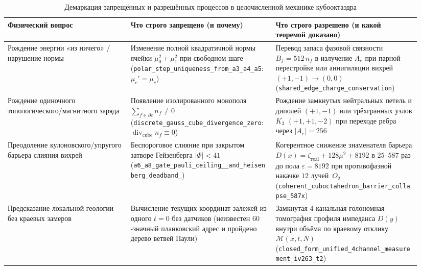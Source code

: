 \begin{table}[htbp]
\centering
\footnotesize
\setlength{\tabcolsep}{4pt}
\caption{Демаркация запрещённых и разрешённых процессов в целочисленной механике кубооктаэдра}
\label{tab:applied-demarcation}
\begin{tabular}{@{}p{0.28\linewidth}p{0.33\linewidth}p{0.33\linewidth}@{}}
\toprule
Физический вопрос & Что строго запрещено (и почему) & Что строго разрешено (и какой теоремой доказано) \\
\midrule
Рождение энергии «из ничего» / нарушение нормы & Изменение полной квадратичной нормы ячейки $\mu_0^2+\mu_1^2$ при свободном шаге (\texttt{polar\_\allowbreak step\_\allowbreak uniqueness\_\allowbreak from\_\allowbreak a3\_\allowbreak a4\_\allowbreak a5}: $\mu_c'=\mu_c$) & Перевод запаса фазовой связности $B_f = 512\,n_f$ в излучение $A_e$ при парной перестройке или аннигиляции вихрей $(+1,-1)\to(0,0)$ (\texttt{shared\_\allowbreak edge\_\allowbreak charge\_\allowbreak conservation}) \\
\addlinespace
Рождение одиночного топологического/магнитного заряда & Появление изолированного монополя $\sum_{f\in\partial c} n_f \ne 0$ (\texttt{discrete\_\allowbreak gauss\_\allowbreak cube\_\allowbreak divergence\_\allowbreak zero}: $\operatorname{div}_{\mathrm{cube}} n_f \equiv 0$) & Рождение замкнутых нейтральных петель и диполей $(+1,-1)$ или трёхгранных узлов $K_3$ $(+1,+1,-2)$ при переходе ребра через $|A_e|=256$ \\
\addlinespace
Преодоление кулоновского/упругого барьера слияния вихрей & Беспороговое слияние при закрытом затворе Гейзенберга $|\Phi|<41$ (\texttt{a6\_\allowbreak a8\_\allowbreak gate\_\allowbreak pauli\_\allowbreak ceiling\_\allowbreak 256\_\allowbreak and\_\allowbreak heisenberg\_\allowbreak deadband\_\allowbreak 41}) & Когерентное снижение знаменателя барьера $D(x) = \zeta_{\mathrm{real}}+128\mu^2+8192$ в $25\text{--}587$ раз до пола $\varepsilon=8192$ при противофазной накачке $12$ лучей~$O_2$ (\texttt{coherent\_\allowbreak cuboctahedron\_\allowbreak barrier\_\allowbreak collapse\_\allowbreak 587x}) \\
\addlinespace
Предсказание локальной геологии без краевых замеров & Вычисление текущих координат залежей из одного $t=0$ без датчиков (неизвестен $60$-значный планковский адрес и пройдено дерево ветвей Паули) & Замкнутая $4$-канальная голономная томография профиля импеданса $D(y)$ внутри объёма по краевому отклику $\mathcal{M}(x,t,N)$ (\texttt{closed\_\allowbreak form\_\allowbreak unified\_\allowbreak 4channel\_\allowbreak measurement\_\allowbreak iv263\_\allowbreak t2}) \\

\end{tabular}
\end{table}
